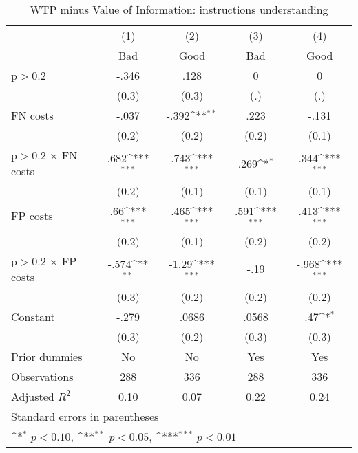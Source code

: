 \begin{table}[htbp]\centering
\def\sym#1{\ifmmode^{#1}\else\(^{#1}\)\fi}
\caption{WTP minus Value of Information: instructions understanding}
\begin{tabular}{l*{4}{c}}
\hline\hline
                &\multicolumn{1}{c}{(1)}&\multicolumn{1}{c}{(2)}&\multicolumn{1}{c}{(3)}&\multicolumn{1}{c}{(4)}\\
                &\multicolumn{1}{c}{Bad}&\multicolumn{1}{c}{Good}&\multicolumn{1}{c}{Bad}&\multicolumn{1}{c}{Good}\\
\hline
p$>$0.2         &    -.346         &     .128         &        0         &        0         \\
                &    (0.3)         &    (0.3)         &      (.)         &      (.)         \\
FN costs        &    -.037         &    -.392\sym{**} &     .223         &    -.131         \\
                &    (0.2)         &    (0.2)         &    (0.2)         &    (0.1)         \\
p$>$0.2 $\times$ FN costs&     .682\sym{***}&     .743\sym{***}&     .269\sym{*}  &     .344\sym{***}\\
                &    (0.2)         &    (0.1)         &    (0.1)         &    (0.1)         \\
FP costs        &      .66\sym{***}&     .465\sym{***}&     .591\sym{***}&     .413\sym{***}\\
                &    (0.2)         &    (0.1)         &    (0.2)         &    (0.2)         \\
p$>$0.2 $\times$ FP costs&    -.574\sym{**} &    -1.29\sym{***}&     -.19         &    -.968\sym{***}\\
                &    (0.3)         &    (0.2)         &    (0.2)         &    (0.2)         \\
Constant        &    -.279         &    .0686         &    .0568         &      .47\sym{*}  \\
                &    (0.3)         &    (0.2)         &    (0.3)         &    (0.3)         \\
Prior dummies   &       No         &       No         &      Yes         &      Yes         \\
\hline
Observations    &      288         &      336         &      288         &      336         \\
Adjusted \(R^{2}\)&     0.10         &     0.07         &     0.22         &     0.24         \\
\hline\hline
\multicolumn{5}{l}{\footnotesize Standard errors in parentheses}\\
\multicolumn{5}{l}{\footnotesize \sym{*} \(p<0.10\), \sym{**} \(p<0.05\), \sym{***} \(p<0.01\)}\\
\end{tabular}
\end{table}
